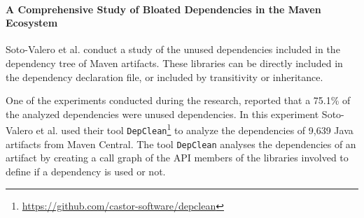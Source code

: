 \begin{comment}
\paragraph{Vulnerable Open Source Dependencies: Counting Those That Matter \cite{pashchenko2018vulnerable}} %
In this research, Pashchenko et al. propose a new method to count the dependencies of libraries. This method is used to analyse the dependencies of 200 libraries of the Maven ecosystem. With their method, they differentiate between libraries from the same project and third-party libraries. Furthermore, the dependencies that are not deployed in production (only used for testing or development purposes) are filtered out, since the vulnerabilities of this dependencies do not affect the final product. Furthermore, they consider the special case of halted dependencies, which are the ones that are not being actively developed. Vulnerabilities in halted dependencies suppose an important threat to the software project that depend on these, since the vulnerability is not going to be fixed.

One of the main contributions of this research is a tool implementing the method defined in the paper to detect the vulnerabilities that, according to their definition, matter.

However, Pashchenko et al. do not perform a call-level analysis of the dependencies, since their dependency resolution is based only on the \textit{POM} file of the libraries. Hence, the transitive dependencies that are not really used in the studied library are still counted.
\end{comment}

\paragraph{A Comprehensive Study of Bloated Dependencies in the Maven Ecosystem \cite{soto2020comprehensive}}
Soto-Valero et al. conduct a study of the unused dependencies included in the dependency tree of Maven artifacts. These libraries can be directly included in the dependency declaration file, or included by transitivity or inheritance.

One of the experiments conducted during the research, reported that a 75.1\% of the analyzed dependencies were unused dependencies. In this experiment Soto-Valero et al. used their tool \texttt{DepClean}\footnote{\href{https://github.com/castor-software/depclean}{https://github.com/castor-software/depclean}} to analyze the dependencies of 9,639 Java artifacts from Maven Central.
The tool \texttt{DepClean} analyses the dependencies of an artifact by creating a call graph of the API members of the libraries involved to define if a dependency is used or not.
